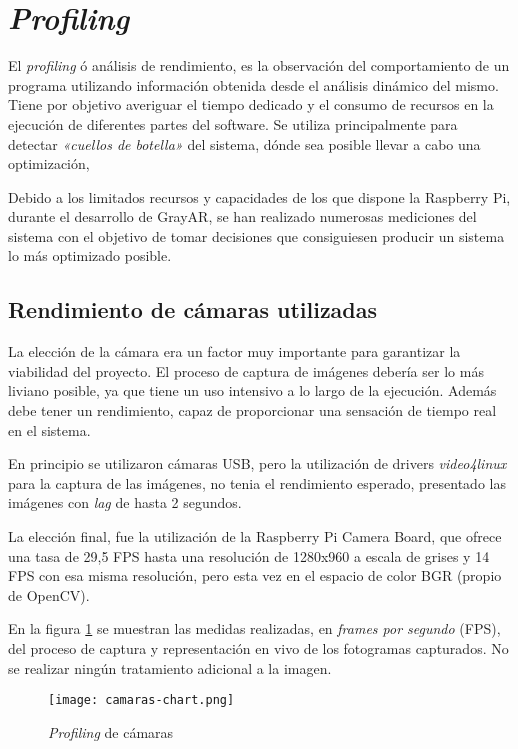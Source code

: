 \section{\textit{Profiling}}

El \textit{profiling} ó análisis de rendimiento, es la observación del comportamiento de un programa utilizando información obtenida desde el análisis dinámico del mismo. Tiene por objetivo averiguar el tiempo dedicado y el consumo de recursos en la ejecución de diferentes partes del software. Se utiliza principalmente para detectar \textit{«cuellos de botella»} del sistema, dónde sea posible llevar a cabo una optimización,

Debido a los limitados recursos y capacidades de los que dispone la Raspberry Pi, durante el desarrollo de GrayAR, se han realizado numerosas mediciones del sistema con el objetivo de tomar decisiones que consiguiesen producir un sistema lo más optimizado posible.

\subsection{Rendimiento de cámaras utilizadas}
La elección de la cámara era un factor muy importante para garantizar la viabilidad del proyecto. El proceso de captura de imágenes debería ser lo más liviano posible, ya que tiene un uso intensivo a lo largo de la ejecución. Además debe tener un rendimiento, capaz de proporcionar una sensación de tiempo real en el sistema. 

En principio se utilizaron cámaras USB, pero la utilización de drivers \textit{video4linux} para la captura de las imágenes, no tenia el rendimiento esperado, presentado las imágenes con \textit{lag} de hasta 2 segundos.

La elección final, fue la utilización de la Raspberry Pi Camera Board, que ofrece una tasa de 29,5 FPS hasta una resolución de 1280x960 a escala de grises y 14 FPS con esa misma resolución, pero esta vez en el espacio de color BGR (propio de OpenCV).

En la figura \ref{fig:camaras_chart} se muestran las medidas realizadas, en \textit{frames por segundo} (FPS), del proceso de captura y representación en vivo de los fotogramas capturados. No se realizar ningún tratamiento adicional a la imagen.

\begin{figure}
  \begin{center}
    \texttt{[image: camaras-chart.png]}
    \caption{\textit{Profiling} de cámaras}
    \label{fig:camaras_chart}
  \end{center}
\end{figure}

